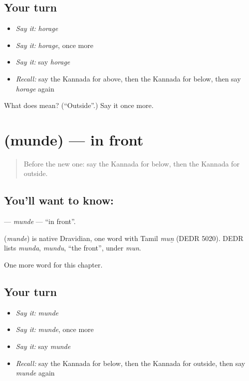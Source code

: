 \subsection*{Your turn}
\begin{itemize}
\raggedright
  \item \emph{Say it:} \emph{horage}
  \item \emph{Say it:} \emph{horage}, once more
  \item \emph{Say it:} say \emph{horage}
  \item \emph{Recall:} say the Kannada for above, then the Kannada for below, then say \emph{horage} again
\end{itemize}

\begin{tcolorbox}[breakable,colback=teal!4,colframe=teal!35!black,title={Before you move on}]
What does  mean? (\textquotedblleft{}Outside\textquotedblright{}.) Say it once more.
\end{tcolorbox}
\section[\texorpdfstring{\kn{ಮುಂದೆ} (munde)}{ಮುಂದೆ (munde)}]{ (munde) — in front}

\label{lesson:KA-C108-munde}



\begin{quote}
Before the new one: say the Kannada for below, then the Kannada for outside.
\end{quote}

\subsection*{You'll want to know: }
\textbf{} — \emph{munde} — \textquotedblleft{}in front\textquotedblright{}.

\begin{cousinweb}
\textbf{} (\emph{munde}) is native Dravidian, one word with Tamil \emph{muṉ} (DEDR 5020). DEDR lists \emph{munda}, \emph{mundu}, \textquotedblleft{}the front\textquotedblright{}, under \emph{mun}.
\end{cousinweb}

\begin{grammarlens}[title={What you've built}]
One more word for this chapter.
\end{grammarlens}

\subsection*{Your turn}
\begin{itemize}
\raggedright
  \item \emph{Say it:} \emph{munde}
  \item \emph{Say it:} \emph{munde}, once more
  \item \emph{Say it:} say \emph{munde}
  \item \emph{Recall:} say the Kannada for below, then the Kannada for outside, then say \emph{munde} again
\end{itemize}

